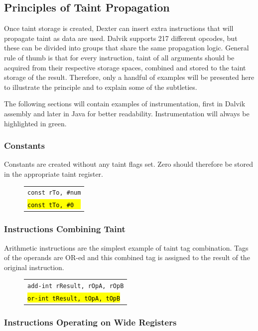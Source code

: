 \documentclass[12pt,twoside,notitlepage]{report}
\newcommand{\centerbox}[1] {
	\begin{center}
	\begin{footnotesize}
	\begin{tabular}{l}
		#1
	\end{tabular}
	\end{footnotesize}
	\end{center}
}
\newcommand{\asm}[1] {\texttt{#1}}
\newcommand{\asmExtra}[1] {\texttt{\hl{#1}}}
\begin{document}
\subsection{Principles of Taint Propagation}

Once taint storage is created, Dexter can insert extra instructions that will propagate taint as data are used. Dalvik supports 217 different opcodes, but these can be divided into groups that share the same propagation logic. General rule of thumb is that for every instruction, taint of all arguments should be acquired from their respective storage spaces, combined and stored to the taint storage of the result. Therefore, only a handful of examples will be presented here to illustrate the principle and to explain some of the subtleties.

The following sections will contain examples of instrumentation, first in Dalvik assembly and later in Java for better readability. Instrumentation will always be highlighted in green. 

\subsubsection{Constants}

Constants are created without any taint flags set. Zero should therefore be stored in the appropriate taint register.

	\begin{figure}[H]
		\centerbox{
			\asm{const rTo, \#num} \\
			\asmExtra{const tTo, \#0~~}
		}
	\end{figure}

\subsubsection{Instructions Combining Taint}

Arithmetic instructions are the simplest example of taint tag combination. Tags of the operands are OR-ed and this combined tag is assigned to the result of the original instruction.

	\begin{figure}[H]
		\centerbox{
			\asm{add-int rResult, rOpA, rOpB} \\
			\asmExtra{or-int tResult, tOpA, tOpB}
		}
	\end{figure}

\subsubsection{Instructions Operating on Wide Registers}
\end{document}
